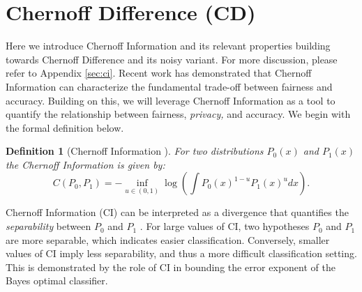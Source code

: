 \documentclass[11pt,letterpaper]{article}
\newtheorem{definition}{Definition}
\begin{document}


\section{Chernoff Difference (CD)}

Here we introduce Chernoff Information and its relevant properties building towards Chernoff Difference and its noisy variant. For more discussion, please refer to Appendix \ref{sec:ci}. Recent work \citep{dutta2020there} has demonstrated that Chernoff Information can characterize the fundamental trade-off between fairness and accuracy. Building on this, we will leverage Chernoff Information as a tool to quantify the relationship between fairness, \textit{privacy,} and accuracy. We begin with the formal definition below.


\begin{definition}
    [Chernoff Information \citep{chernoff1952measure}] For two distributions $P_0(x)$ and $P_1(x)$ the Chernoff Information is given by:
    \begin{equation}
        C(P_0, P_1) = -\inf_{u\in(0,1)} \log(\int P_0(x)^{1-u}P_1(x)^udx).    
    \end{equation}
\end{definition}
Chernoff Information (CI) can be interpreted as a divergence that quantifies the \textit{separability} between $P_0$ and $P_1$ \citep{dutta2020there, nielsen2011}. For large values of CI, two hypotheses $P_0$ and $P_1$ are more separable, which indicates easier classification. Conversely, smaller values of CI imply less separability, and thus a more difficult classification setting. This is demonstrated by the role of CI in bounding the error exponent of the Bayes optimal classifier.
\end{document}

